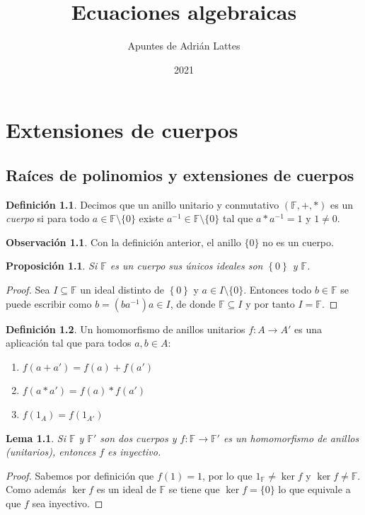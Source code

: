 \documentclass[10pt, spanish]{report}
\title{Ecuaciones algebraicas}
\author{Apuntes de Adrián Lattes}
\date{2021}
\newtheorem*{lema}{Lema}
\newtheorem*{prop}{Proposición}
\theoremstyle{definition}
\newtheorem*{defin}{Definición}
\newtheorem*{obs}{Observación}
\newcommand{\F}{\mathbb{F}}
\newcommand{\fecha}[1]{\marginpar{\underline{#1}}}
\begin{document}
\maketitle

\chapter{Extensiones de cuerpos}
\fecha{15/02}
\section{Raíces de polinomios y extensiones de cuerpos}

\begin{defin}
    Decimos que un anillo unitario y conmutativo $(\F,+,*)$ es un
    \textit{cuerpo} si para todo $a\in \F\setminus\{0\}$ existe $a^{-1}\in
    \F\setminus\{0\}$ tal que $a*a^{-1}=1$ y $1\neq 0$.
\end{defin}

\begin{obs}
    Con la definición anterior, el anillo $\{0\}$ no es un cuerpo.
\end{obs}

\begin{prop}
    Si $\F$ es un cuerpo sus únicos ideales son $\left\{ 0 \right\}$ y $\F$.
\end{prop}
\begin{proof}
    Sea $I\subseteq \F$ un ideal distinto de $\left\{ 0 \right\}$ y $a\in
    I\setminus\{0\}$. Entonces todo $b\in\F$ se puede escribir como
    $b=(ba^{-1})a\in I$, de donde $\F\subseteq I$ y por tanto $I=\F$.
\end{proof}

\begin{defin}
    Un homomorfismo de anillos unitarios $f:A\to A'$ es una aplicación tal que
    para todos $a,b\in A$:
    \begin{enumerate}
        \item $f(a+a')=f(a)+f(a')$
        \item $f(a*a')=f(a)*f(a')$
        \item $f(1_A)=f(1_{A'})$
    \end{enumerate}
\end{defin}

\begin{lema}
    Si $\F$ y $\F'$ son dos cuerpos y $f: \F\to\F'$ es un homomorfismo de
    anillos (unitarios), entonces $f$ es inyectivo.
\end{lema}
\begin{proof}
    Sabemos por definición que $f(1)=1$, por lo que $1_\F\neq \ker{f}$ y
    $\ker{f}\neq \F$. Como además $\ker{f}$ es un ideal de $\F$ se tiene que
    $\ker{f}=\{0\}$ lo que equivale a que $f$ sea inyectivo.
\end{proof}
\end{document}
